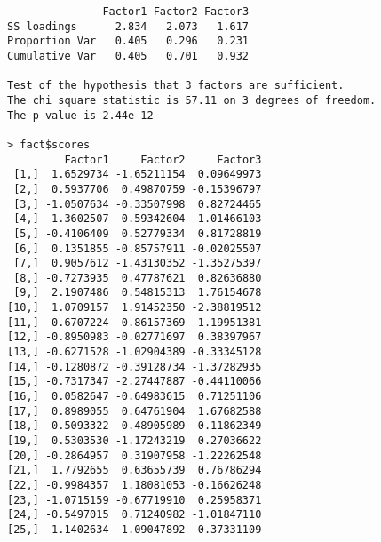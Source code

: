 \begin{enumerate}
\begin{lstlisting}
               Factor1 Factor2 Factor3
SS loadings      2.834   2.073   1.617
Proportion Var   0.405   0.296   0.231
Cumulative Var   0.405   0.701   0.932

Test of the hypothesis that 3 factors are sufficient.
The chi square statistic is 57.11 on 3 degrees of freedom.
The p-value is 2.44e-12

> fact$scores
         Factor1     Factor2     Factor3
 [1,]  1.6529734 -1.65211154  0.09649973
 [2,]  0.5937706  0.49870759 -0.15396797
 [3,] -1.0507634 -0.33507998  0.82724465
 [4,] -1.3602507  0.59342604  1.01466103
 [5,] -0.4106409  0.52779334  0.81728819
 [6,]  0.1351855 -0.85757911 -0.02025507
 [7,]  0.9057612 -1.43130352 -1.35275397
 [8,] -0.7273935  0.47787621  0.82636880
 [9,]  2.1907486  0.54815313  1.76154678
[10,]  1.0709157  1.91452350 -2.38819512
[11,]  0.6707224  0.86157369 -1.19951381
[12,] -0.8950983 -0.02771697  0.38397967
[13,] -0.6271528 -1.02904389 -0.33345128
[14,] -0.1280872 -0.39128734 -1.37282935
[15,] -0.7317347 -2.27447887 -0.44110066
[16,]  0.0582647 -0.64983615  0.71251106
[17,]  0.8989055  0.64761904  1.67682588
[18,] -0.5093322  0.48905989 -0.11862349
[19,]  0.5303530 -1.17243219  0.27036622
[20,] -0.2864957  0.31907958 -1.22262548
[21,]  1.7792655  0.63655739  0.76786294
[22,] -0.9984357  1.18081053 -0.16626248
[23,] -1.0715159 -0.67719910  0.25958371
[24,] -0.5497015  0.71240982 -1.01847110
[25,] -1.1402634  1.09047892  0.37331109


\end{lstlisting}
\end{enumerate}
